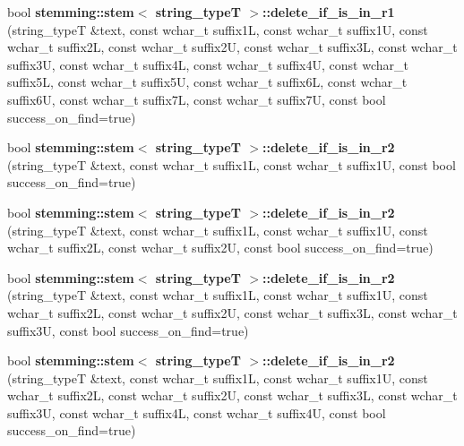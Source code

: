 \begin{DoxyCompactItemize}
\item 
\hypertarget{group___stemming_gacdf0457bd3392f1ac23dadef5515cebd}{bool {\bfseries stemming\-::stem$<$ string\-\_\-type\-T $>$\-::delete\-\_\-if\-\_\-is\-\_\-in\-\_\-r1} (string\-\_\-type\-T \&text, const wchar\-\_\-t suffix1\-L, const wchar\-\_\-t suffix1\-U, const wchar\-\_\-t suffix2\-L, const wchar\-\_\-t suffix2\-U, const wchar\-\_\-t suffix3\-L, const wchar\-\_\-t suffix3\-U, const wchar\-\_\-t suffix4\-L, const wchar\-\_\-t suffix4\-U, const wchar\-\_\-t suffix5\-L, const wchar\-\_\-t suffix5\-U, const wchar\-\_\-t suffix6\-L, const wchar\-\_\-t suffix6\-U, const wchar\-\_\-t suffix7\-L, const wchar\-\_\-t suffix7\-U, const bool success\-\_\-on\-\_\-find=true)}\label{group___stemming_gacdf0457bd3392f1ac23dadef5515cebd}

\item 
\hypertarget{group___stemming_ga722e75e6404934da2f0c9c00ffded48a}{bool {\bfseries stemming\-::stem$<$ string\-\_\-type\-T $>$\-::delete\-\_\-if\-\_\-is\-\_\-in\-\_\-r2} (string\-\_\-type\-T \&text, const wchar\-\_\-t suffix1\-L, const wchar\-\_\-t suffix1\-U, const bool success\-\_\-on\-\_\-find=true)}\label{group___stemming_ga722e75e6404934da2f0c9c00ffded48a}

\item 
\hypertarget{group___stemming_ga33bf1854d1748ba97e30ad798f828b0e}{bool {\bfseries stemming\-::stem$<$ string\-\_\-type\-T $>$\-::delete\-\_\-if\-\_\-is\-\_\-in\-\_\-r2} (string\-\_\-type\-T \&text, const wchar\-\_\-t suffix1\-L, const wchar\-\_\-t suffix1\-U, const wchar\-\_\-t suffix2\-L, const wchar\-\_\-t suffix2\-U, const bool success\-\_\-on\-\_\-find=true)}\label{group___stemming_ga33bf1854d1748ba97e30ad798f828b0e}

\item 
\hypertarget{group___stemming_gac78dd58f01ed17a41eedc33d5b2deedb}{bool {\bfseries stemming\-::stem$<$ string\-\_\-type\-T $>$\-::delete\-\_\-if\-\_\-is\-\_\-in\-\_\-r2} (string\-\_\-type\-T \&text, const wchar\-\_\-t suffix1\-L, const wchar\-\_\-t suffix1\-U, const wchar\-\_\-t suffix2\-L, const wchar\-\_\-t suffix2\-U, const wchar\-\_\-t suffix3\-L, const wchar\-\_\-t suffix3\-U, const bool success\-\_\-on\-\_\-find=true)}\label{group___stemming_gac78dd58f01ed17a41eedc33d5b2deedb}

\item 
\hypertarget{group___stemming_ga3a79fd0ac96d009d0c93f1bec847c2ff}{bool {\bfseries stemming\-::stem$<$ string\-\_\-type\-T $>$\-::delete\-\_\-if\-\_\-is\-\_\-in\-\_\-r2} (string\-\_\-type\-T \&text, const wchar\-\_\-t suffix1\-L, const wchar\-\_\-t suffix1\-U, const wchar\-\_\-t suffix2\-L, const wchar\-\_\-t suffix2\-U, const wchar\-\_\-t suffix3\-L, const wchar\-\_\-t suffix3\-U, const wchar\-\_\-t suffix4\-L, const wchar\-\_\-t suffix4\-U, const bool success\-\_\-on\-\_\-find=true)}\label{group___stemming_ga3a79fd0ac96d009d0c93f1bec847c2ff}


\end{DoxyCompactItemize}
